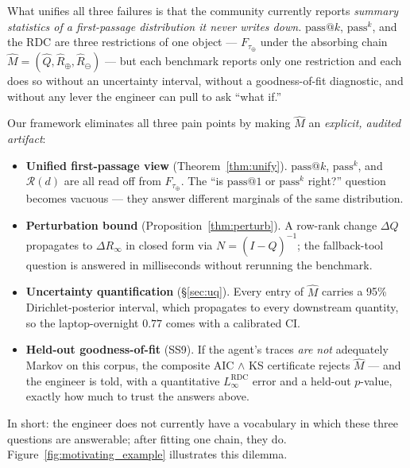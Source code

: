 \documentclass[conference]{IEEEtran}
\begin{document}
What unifies all three failures is that the community currently reports \emph{summary statistics of a first-passage distribution it never writes down.} $\mathrm{pass}@k$, $\mathrm{pass}^k$, and the RDC are three restrictions of one object --- $F_{\tau_\oplus}$ under the absorbing chain $\hat M = (\hat Q, \hat R_\oplus, \hat R_\ominus)$ --- but each benchmark reports only one restriction and each does so without an uncertainty interval, without a goodness-of-fit diagnostic, and without any lever the engineer can pull to ask ``what if.''

Our framework eliminates all three pain points by making $\hat M$ an \emph{explicit, audited artifact}:

\begin{itemize}
    \item \textbf{Unified first-passage view} (Theorem~\ref{thm:unify}). $\mathrm{pass}@k$, $\mathrm{pass}^k$, and $\mathcal{R}(d)$ are all read off from $F_{\tau_\oplus}$. The ``is $\mathrm{pass}@1$ or $\mathrm{pass}^k$ right?'' question becomes vacuous --- they answer different marginals of the same distribution.
    \item \textbf{Perturbation bound} (Proposition~\ref{thm:perturb}). A row-rank change $\Delta Q$ propagates to $\Delta R_\infty$ in closed form via $N = (I - \hat Q)^{-1}$; the fallback-tool question is answered in milliseconds without rerunning the benchmark.
    \item \textbf{Uncertainty quantification} (\S\ref{sec:uq}). Every entry of $\hat M$ carries a 95\% Dirichlet-posterior interval, which propagates to every downstream quantity, so the laptop-overnight $0.77$ comes with a calibrated CI.
    \item \textbf{Held-out goodness-of-fit} (SS9). If the agent's traces \emph{are not} adequately Markov on this corpus, the composite AIC $\wedge$ KS certificate rejects $\hat M$ --- and the engineer is told, with a quantitative $L_\infty^{\mathrm{RDC}}$ error and a held-out $p$-value, exactly how much to trust the answers above.
\end{itemize}

In short: the engineer does not currently have a vocabulary in which these three questions are answerable; after fitting one chain, they do. Figure~\ref{fig:motivating_example} illustrates this dilemma.
\end{document}
